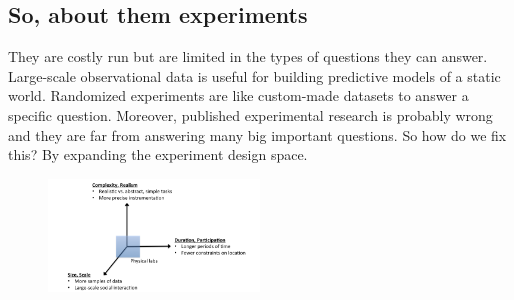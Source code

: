 \subsection{So, about them experiments}
They are costly run but are limited in the types of questions they can answer. Large-scale observational data is useful for building predictive models of a static world. Randomized experiments are like custom-made datasets to answer a specific question. Moreover, published experimental research is probably wrong and they are far from answering many big important questions. So how do we fix this? By expanding the experiment design space.

\begin{figure}[ht]
  \begin{center}
    \includegraphics[width=0.5\textwidth]{figures/expanding_experiment.png}
  \end{center}
\end{figure}
